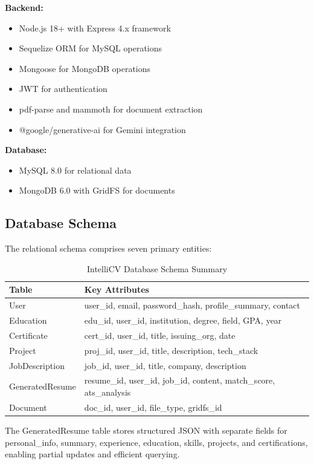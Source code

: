 \documentclass[conference]{IEEEtran}
\begin{document}
\textbf{Backend:}
\begin{itemize}
    \item Node.js 18+ with Express 4.x framework
    \item Sequelize ORM for MySQL operations
    \item Mongoose for MongoDB operations
    \item JWT for authentication
    \item pdf-parse and mammoth for document extraction
    \item @google/generative-ai for Gemini integration
\end{itemize}

\textbf{Database:}
\begin{itemize}
    \item MySQL 8.0 for relational data
    \item MongoDB 6.0 with GridFS for documents
\end{itemize}

\subsection{Database Schema}

The relational schema comprises seven primary entities:

\begin{table}[h]
\centering
\caption{IntelliCV Database Schema Summary}
\label{tab:schema}
\begin{tabular}{@{}lp{4.5cm}@{}}
\toprule
\textbf{Table} & \textbf{Key Attributes} \\
\midrule
User & user\_id, email, password\_hash, profile\_summary, contact \\
Education & edu\_id, user\_id, institution, degree, field, GPA, year \\
Certificate & cert\_id, user\_id, title, issuing\_org, date \\
Project & proj\_id, user\_id, title, description, tech\_stack \\
JobDescription & job\_id, user\_id, title, company, description \\
GeneratedResume & resume\_id, user\_id, job\_id, content, match\_score, ats\_analysis \\
Document & doc\_id, user\_id, file\_type, gridfs\_id \\
\bottomrule
\end{tabular}
\end{table}

The GeneratedResume table stores structured JSON with separate fields for personal\_info, summary, experience, education, skills, projects, and certifications, enabling partial updates and efficient querying.
\end{document}
